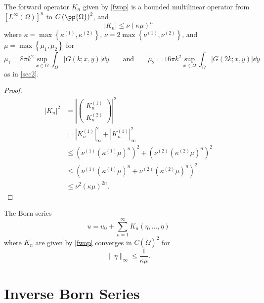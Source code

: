 \documentclass[a4paper, 12pt]{article}
\begin{document}

\begin{prop}\label{convgprop}
	The forward operator $K_{n}$ given by \cref{fwop} is a bounded multilinear operator from $\left[ L^{\infty}\left( \Omega \right)\right]^{n} $ to $ C\left( \pp{\Omega} \right)  ^2$, and
	\begin{equation}\label{fwopbnd}
		\left| K_{n} \right| \le \nu \left( \kappa \mu \right)^{n}
	\end{equation}
	where $\kappa = \max \left\{ \kappa^{(1)}, \kappa^{(2)} \right\}$,
	$\nu = 2\max \left\{ \nu^{(1)}, \nu^{(2)} \right\}$,
	and $\mu =\max \left\{ \mu_1,\mu_2 \right\} $ for
	\[
	\mu_1 = 8\pi k^2 \sup_{x \in \Omega}\int_{\Omega}^{} \left| G\left( k; x, y \right)  \right| \dd{y}
	\qquad \text{and} \qquad
	\mu_2 = 16\pi k^2 \sup_{x \in \Omega}\int_{\Omega}^{} \left| G\left( 2k; x, y \right)  \right| \dd{y}
	\] 
	as in \cref{sec2}.
\end{prop}
\begin{proof}
	\begin{align*}
		\left| K_{n} \right|^2 &= \left| \begin{pmatrix} K_{n}^{(1)}\\K_{n}^{(2)} \end{pmatrix}  \right|^2\\
	&= \left| K_{n}^{(1)} \right|_{\infty}^2 + \left| K_{n}^{(1)}\right|_{\infty}^2\\
	&\le \left( \nu^{(1)} \left( \kappa^{(1)}\mu \right)^n \right)^2 +  \left( \nu^{(2)} \left( \kappa^{(2)}\mu \right)^n \right)^2\\
	&\le \left( \nu^{(1)} \left(\kappa^{(1)}\mu \right)^n + \nu^{(2)} \left( \kappa^{(2)}\mu \right)^n \right)^2\\
	&\le \nu^2 \left( \kappa\mu \right)^{2n}
	.\end{align*}
\end{proof}

\begin{cor}
	The Born series 
	\[
	u = u_0 + \sum_{n=1}^{\infty} K_{n}\left( \eta,\ldots,\eta \right) 
	\] 
	where $K_{n}$ are given by \cref{fwop} converges in $C\left( \overline{\Omega} \right)^2$ for
	\[
	\lVert \eta \rVert_{\infty} \le  \frac{1}{\kappa \mu}
	.\] 
\end{cor}


\section{Inverse Born Series}
\end{document}
